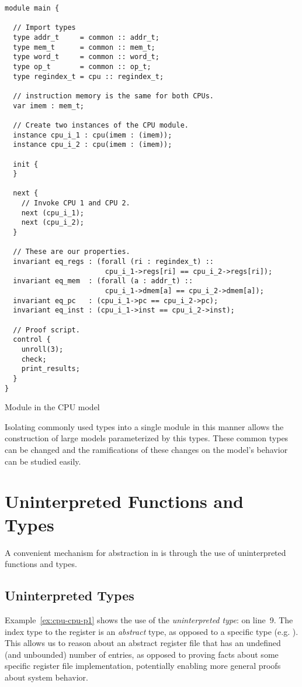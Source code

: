 \begin{uclidlisting}[htbp]
\begin{lstlisting}[language=uclid,style=uclidstyle]
module main {

  // Import types
  type addr_t     = common :: addr_t;
  type mem_t      = common :: mem_t;
  type word_t     = common :: word_t;
  type op_t       = common :: op_t;
  type regindex_t = cpu :: regindex_t;
  
  // instruction memory is the same for both CPUs.
  var imem : mem_t;

  // Create two instances of the CPU module.
  instance cpu_i_1 : cpu(imem : (imem));
  instance cpu_i_2 : cpu(imem : (imem));

  init {
  }

  next {
    // Invoke CPU 1 and CPU 2.
    next (cpu_i_1);
    next (cpu_i_2);
  }
  
  // These are our properties.
  invariant eq_regs : (forall (ri : regindex_t) :: 
                        cpu_i_1->regs[ri] == cpu_i_2->regs[ri]);
  invariant eq_mem  : (forall (a : addr_t) :: 
                        cpu_i_1->dmem[a] == cpu_i_2->dmem[a]);
  invariant eq_pc   : (cpu_i_1->pc == cpu_i_2->pc);
  invariant eq_inst : (cpu_i_1->inst == cpu_i_2->inst);

  // Proof script.
  control {
    unroll(3);
    check;
    print_results;
  }
}
\end{lstlisting}
\caption{Module  in the CPU model}
\label{ex:cpu-main}
\end{uclidlisting}


Isolating commonly used types into a single module in this manner allows the construction of large models parameterized by this types. These common types can be changed and the ramifications of these changes on the model's behavior can be studied easily.

\section{Uninterpreted Functions and Types}
A convenient mechanism for abstraction in \uclid{} is through the use of uninterpreted functions and types.

\subsection{Uninterpreted Types}
Example~\ref{ex:cpu-cpu-p1} shows the use of the \emph{uninterpreted type}:  on line~9. The index type to the register is an \emph{abstract} type, as opposed to a specific type (e.g. ). This allows us to reason about an abstract register file that has an undefined (and unbounded) number of entries, as opposed to proving facts about some specific register file implementation, potentially enabling more general proofs about system behavior.


